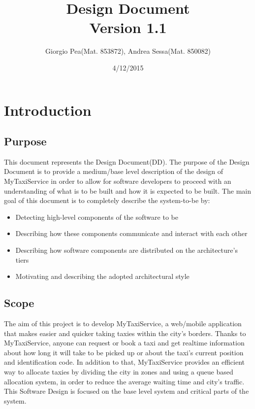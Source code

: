\documentclass[11pt,titlepage]{article} %
\title{\textbf{D}esign \textbf{D}ocument \\ \vspace{1cm} \large{Version 1.1}}
\author{Giorgio Pea(Mat. 853872), Andrea Sessa(Mat. 850082)}
\date{4/12/2015}
\begin{document}
\maketitle

\newpage

\tableofcontents

\newpage

\section{Introduction}

\subsection{Purpose}
    This document represents the Design Document(DD).
    The purpose of the Design Document is to provide a medium/base level description of the design of MyTaxiService
    in order to allow for software developers to proceed with an understanding of what is to be
    built and how it is expected to be built.\newline
    The main goal of this document is to completely describe the system-to-be by:
    \begin{itemize}
      \item Detecting high-level components of the software to be
      \item Describing how these components communicate and interact with each other
      \item Describing how software components are distributed on the architecture's tiers
      \item Motivating and describing the adopted architectural style
   \end{itemize}

\subsection{Scope}
    The aim of this project is to develop MyTaxiService, a web/mobile application that
    makes easier and quicker taking taxies within the city’s borders. Thanks to MyTaxiService,
    anyone can request or book a taxi and get realtime information about how long
    it will take to be picked up or about the taxi’s current position and identification code.
    In addition to that, MyTaxiService provides an efficient way to allocate taxies by dividing
    the city in zones and using a queue based allocation system, in order to reduce the
    average waiting time and city’s traffic.\newline
    This Software Design is focused on the base level system and critical parts
    of the system.
\end{document}
